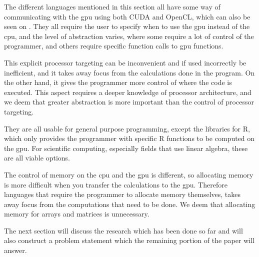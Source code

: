 The different languages mentioned in this section all have some way of communicating with the \acrshort{gpu} using both CUDA and OpenCL, which can also be seen on .
They all require the user to specify when to use the \acrshort{gpu} instead of the \acrshort{cpu}, and the level of abstraction varies, where some require a lot of control of the programmer, and others require specific function calls to \acrshort{gpu} functions.

This explicit processor targeting can be inconvenient and if used incorrectly be inefficient, and it takes away focus from the calculations done in the program.
On the other hand, it gives the programmer more control of where the code is executed.
This aspect requires a deeper knowledge of processor architecture, and we deem that greater abstraction is more important than the control of processor targeting.

They are all usable for general purpose programming, except the libraries for R, which only provides the programmer with specific R functions to be computed on the \acrshort{gpu}. 
For scientific computing, especially fields that use linear algebra, these are all viable options.

The control of memory on the \acrshort{cpu} and the \acrshort{gpu} is different, so allocating memory is more difficult when you transfer the calculations to the \acrshort{gpu}. 
Therefore languages that require the programmer to allocate memory themselves, takes away focus from the computations that need to be done.
We deem that allocating memory for arrays and matrices is unnecessary. 

The next section will discuss the research which has been done so far and will also construct a problem statement which the remaining portion of the paper will answer.